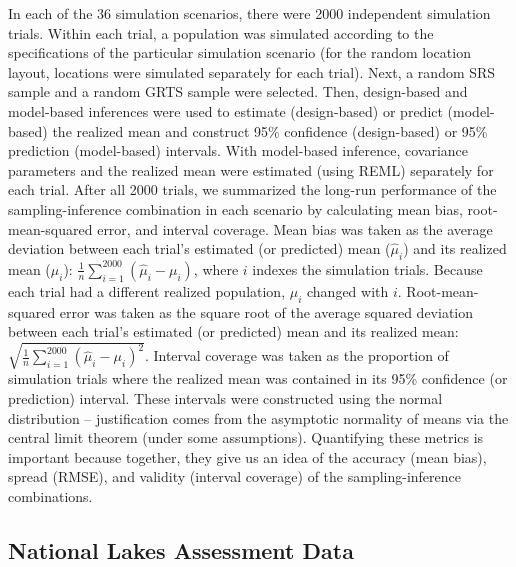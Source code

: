 \documentclass[]{elsarticle} %
\begin{document}
In each of the 36 simulation scenarios, there were 2000 independent
simulation trials. Within each trial, a population was simulated
according to the specifications of the particular simulation scenario
(for the random location layout, locations were simulated separately for
each trial). Next, a random SRS sample and a random GRTS sample were
selected. Then, design-based and model-based inferences were used to
estimate (design-based) or predict (model-based) the realized mean and
construct 95\% confidence (design-based) or 95\% prediction
(model-based) intervals. With model-based inference, covariance
parameters and the realized mean were estimated (using REML) separately
for each trial. After all 2000 trials, we summarized the long-run
performance of the sampling-inference combination in each scenario by
calculating mean bias, root-mean-squared error, and interval coverage.
Mean bias was taken as the average deviation between each trial's
estimated (or predicted) mean (\(\hat{\mu}_i\)) and its realized mean
(\(\mu_i\)): \(\frac{1}{n}\sum_{i = 1}^{2000} (\hat{\mu}_i - \mu_i)\),
where \(i\) indexes the simulation trials. Because each trial had a
different realized population, \(\mu_i\) changed with \(i\).
Root-mean-squared error was taken as the square root of the average
squared deviation between each trial's estimated (or predicted) mean and
its realized mean:
\(\sqrt{\frac{1}{n}\sum_{i = 1}^{2000} (\hat{\mu}_i - \mu_i)^2}\).
Interval coverage was taken as the proportion of simulation trials where
the realized mean was contained in its 95\% confidence (or prediction)
interval. These intervals were constructed using the normal distribution
-- justification comes from the asymptotic normality of means via the
central limit theorem (under some assumptions). Quantifying these
metrics is important because together, they give us an idea of the
accuracy (mean bias), spread (RMSE), and validity (interval coverage) of
the sampling-inference combinations.

\hypertarget{sec:mm_app}{%
\subsection{National Lakes Assessment Data}\label{sec:mm_app}}
\end{document}
